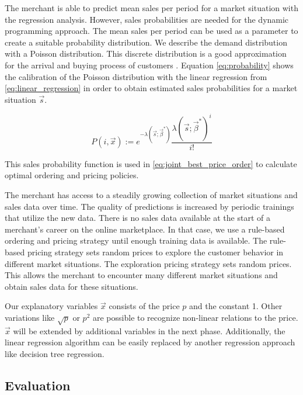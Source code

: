 The merchant is able to predict mean sales per period for a market situation with the regression analysis.
However, sales probabilities are needed for the dynamic programming approach.
The mean sales per period can be used as a parameter to create a suitable probability distribution.
We describe the demand distribution with a Poisson distribution.
This discrete distribution is a good approximation for the arrival and buying process of customers \cite{DBLP:journals/ior/Wolff82}.
Equation \ref{eq:probability} shows the calibration of the Poisson distribution with the linear regression from \cref{eq:linear_regression} in order to obtain estimated sales probabilities for a market situation $\vec{s}$.

\begin{equation}
\label{eq:probability}
P(i, \vec{x}) :=
	e^{-\lambda(\vec{s}; \vec{\beta}^*)}
	\frac{\lambda(\vec{s}; \vec{\beta}^*)^{i}}{i!}
\end{equation}

This sales probability function is used in \cref{eq:joint_best_price_order} to calculate optimal ordering and pricing policies.

The merchant has access to a steadily growing collection of market situations and sales data over time.
The quality of predictions is increased by periodic trainings that utilize the new data.
There is no sales data available at the start of a merchant's career on the online marketplace.
In that case, we use a rule-based ordering and pricing strategy until enough training data is available.
The rule-based pricing strategy sets random prices to explore the customer behavior in different market situations.
The exploration pricing strategy sets random prices.
This allows the merchant to encounter many different market situations and obtain sales data for these situations.

Our explanatory variables $\vec{x}$ consists of the price $p$ and the constant 1.
Other variations like $\sqrt{p}$ or $p^2$ are possible to recognize non-linear relations to the price.
$\vec{x}$ will be extended by additional variables in the next phase.
Additionally, the linear regression algorithm can be easily replaced by another regression approach like decision tree regression.

\subsection{Evaluation}


